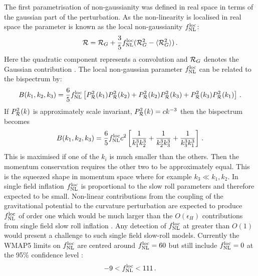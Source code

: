 The first parametrisation of non-gaussianity was defined in
real space in terms of the gaussian part of the perturbation. As the
non-linearity is localised in real space the parameter is
known as the local non-gaussianity $f_{\mathrm{NL}}^\mathrm{loc}$: 
% 
\begin{equation} 
{\cal{R}} = {\cal{R}}_G + \frac{3}{5} f_{\mathrm{NL}}^\mathrm{loc}  (
{\cal{R}}_G^2 -\langle {\cal{R}}_G^2 \rangle )\,.
\end{equation}
Here the 
quadratic component represents a convolution and 
$\mathcal{R}_G$ denotes the Gaussian contribution \cite{maldacena}\footnotemark.
The local non-gaussian parameter $f_{\mathrm{NL}}^\mathrm{loc}$ can be related to the bispectrum by:
\begin{equation}
 B(k_1, k_2, k_3) = \frac{6}{5}f_{\mathrm{NL}}^\mathrm{loc} \left[P_{\mathcal{R}}^2(k_1)P_{\mathcal{R}}^2(k_2) +
P_{\mathcal{R}}^2(k_2)P_{\mathcal{R}}^2(k_3) + P_{\mathcal{R}}^2(k_3)P_{\mathcal{R}}^2(k_1)\right]\,.
\end{equation}
% 
If $P_{\mathcal{R}}^2(k)$ is approximately scale invariant, $P_{\mathcal{R}}^2(k) = c k^{-3}$ then
the bispectrum becomes \cite{Baumann2009}
% 
\begin{equation}
 B(k_1, k_2, k_3) = \frac{6}{5}f_{\mathrm{NL}}^\mathrm{loc} c^2\left[\frac{1}{k_1^3 k_2^3} +
\frac{1}{k_2^3 k_3^3} + \frac{1}{k_3^3 k_1^3}\right]\,.
\end{equation}
% 
This is maximised if one of the $k_i$ is much smaller than the others. Then the
momentum conservation requires the other two to be approximately equal. This is
the squeezed shape in momentum space where for example $k_3 \ll k_1,k_2$. In
single field inflation $f_{\mathrm{NL}}^\mathrm{loc}$ is proportional to the slow roll parameters
and therefore expected to be small. Non-linear contributions from the coupling
of the gravitational potential to the curvature perturbation are expected to
produce $f_{\mathrm{NL}}^\mathrm{loc}$ of order one which would be much larger than the
$O(\epsilon_H)$ contributions from single field slow roll inflation
\cite{Bartolo:2004if, Komatsu:2008hk}. Any detection of $f_{\mathrm{NL}}^\mathrm{loc}$ at greater
than $O(1)$ would present a challenge to such single field slow-roll models. 
Currently the WMAP5 limits on $f_{\mathrm{NL}}^\mathrm{loc}$ are centred around $f_{\mathrm{NL}}^\mathrm{loc}=60$ but
still include $f_{\mathrm{NL}}^\mathrm{loc}=0$ at the 95\% confidence level \cite{Komatsu:2008hk}:
\begin{equation}
 -9<f_{\mathrm{NL}}^\mathrm{loc}<111\,.
\end{equation}


